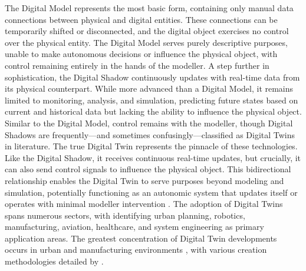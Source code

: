 The Digital Model represents the most basic form, containing only manual data connections between physical and digital entities. These connections can be temporarily shifted or disconnected, and the digital object exercises no control over the physical entity. The Digital Model serves purely descriptive purposes, unable to make autonomous decisions or influence the physical object, with control remaining entirely in the hands of the modeller.
A step further in sophistication, the Digital Shadow continuously updates with real-time data from its physical counterpart. While more advanced than a Digital Model, it remains limited to monitoring, analysis, and simulation, predicting future states based on current and historical data but lacking the ability to influence the physical object. Similar to the Digital Model, control remains with the modeller, though Digital Shadows are frequently—and sometimes confusingly—classified as Digital Twins in literature.
The true Digital Twin represents the pinnacle of these technologies. Like the Digital Shadow, it receives continuous real-time updates, but crucially, it can also send control signals to influence the physical object. This bidirectional relationship enables the Digital Twin to serve purposes beyond modeling and simulation, potentially functioning as an autonomic system that updates itself or operates with minimal modeller intervention \parencite{kritzinger2018digital}.
The adoption of Digital Twins spans numerous sectors, with \cite{jeremiah2024comprehensive} identifying urban planning, robotics, manufacturing, aviation, healthcare, and system engineering as primary application areas. The greatest concentration of Digital Twin developments occurs in urban and manufacturing environments \parencite{sanabria}, with various creation methodologies detailed by \cite{schwede2024learning}.

